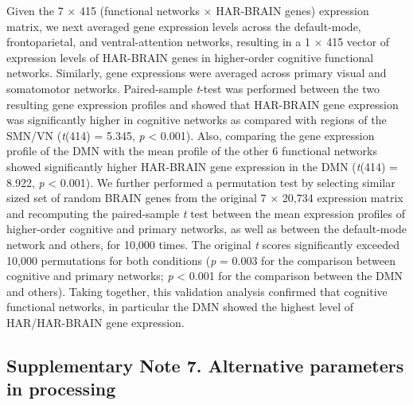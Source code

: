 \begin{refsection}
Given the 7 $\times$ 415 (functional networks $\times$ HAR-BRAIN genes) expression matrix, we next averaged gene expression levels across the default-mode, frontoparietal, and ventral-attention networks, resulting in a 1 $\times$ 415 vector of expression levels of HAR-BRAIN genes in higher-order cognitive functional networks. Similarly, gene expressions were averaged across primary visual and somatomotor networks. Paired-sample \textit{t}-test was performed between the two resulting gene expression profiles and showed that HAR-BRAIN gene expression was significantly higher in cognitive networks as compared with regions of the SMN/VN (\textit{t}(414) = 5.345, \textit{p} < 0.001). Also, comparing the gene expression profile of the DMN with the mean profile of the other 6 functional networks showed significantly higher HAR-BRAIN gene expression in the DMN (\textit{t}(414) = 8.922, \textit{p} < 0.001). We further performed a permutation test by selecting similar sized set of random BRAIN genes from the original 7 $ \times $  20,734 expression matrix and recomputing the paired-sample \textit{t} test between the mean expression profiles of higher-order cognitive and primary networks, as well as between the default-mode network and others, for 10,000 times. The original \textit{t} scores significantly exceeded 10,000 permutations for both conditions (\textit{p} = 0.003 for the comparison between cognitive and primary networks; \textit{p} < 0.001 for the comparison between the DMN and others). Taking together, this validation analysis confirmed that cognitive functional networks, in particular the DMN showed the highest level of HAR/HAR-BRAIN gene expression.

\subsection*{Supplementary Note 7. Alternative parameters in processing}

\end{refsection}
